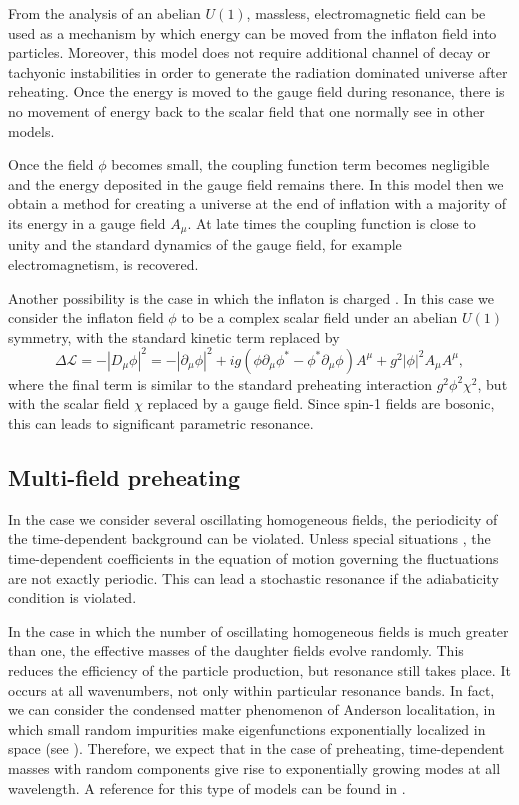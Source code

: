 \documentclass[11pt,a4paper,twoside]{book}
\begin{document}
From  the analysis of \cite{Chap4:GaugeFieldPreheating} an abelian $ U(1) $, massless, electromagnetic field can be used as a mechanism  by which energy can be moved from the inflaton field into particles. Moreover, this model does not require additional channel of decay or tachyonic instabilities in order to generate the radiation dominated universe after reheating. Once the energy is moved to the gauge field during resonance, there is no movement of energy back to the scalar field that one normally see in other models.

Once the field $\phi$ becomes small, the coupling function term becomes negligible and the energy deposited in the gauge field remains there. In this model then we obtain a method for creating a universe at the end of inflation with a majority of its energy in a gauge field $ A_{\mu} $. At late times the coupling function is close to unity and the standard dynamics of the gauge field, for example electromagnetism, is recovered. 

Another possibility is the case in which the inflaton is charged \cite{Chap4:ChargedInflatonPreheating}. In this case we consider  the inflaton field $\phi$ to be a complex scalar field under an abelian $ U(1) $ symmetry, with the standard kinetic term replaced by 
\begin{equation}
\label{Chap4:OtherModels_U1KineticTemr}
\Delta \mathcal{L} = - |D_{\mu}\phi|^{2} = -|\partial_{\mu}\phi|^{2} + ig(\phi \partial_{\mu}\phi^{*}-\phi^{*}\partial_{\mu}\phi)A^{\mu} + g^{2}|\phi|^{2}A_{\mu}A^{\mu},
\end{equation}
where the final term is similar to the standard preheating interaction $ g^{2}\phi^{2}\chi^{2} $, but with the scalar field $\chi$ replaced by a gauge field. Since spin-1 fields are bosonic, this can leads to significant parametric resonance. 

\subsection{Multi-field preheating}
In the case we consider several oscillating homogeneous fields, the periodicity of the time-dependent background can be violated. Unless special situations \cite{Chap4:Lozanov}, the time-dependent coefficients in the equation of motion governing the fluctuations are not exactly periodic. This can lead a stochastic resonance if the adiabaticity condition is violated. 

In the case in which the number of oscillating homogeneous fields is much greater than one, the effective masses of the daughter fields evolve randomly. This reduces the efficiency of the particle production, but resonance still takes place. It occurs at all wavenumbers, not only within particular resonance bands. In fact, we can consider the condensed matter phenomenon of Anderson localitation, in which small random impurities make eigenfunctions exponentially localized in space (see \cite{Chap4:Lozanov}). Therefore, we expect that in the case of preheating, time-dependent masses with random components give rise to exponentially growing modes at all wavelength. A reference for this type of models can  be found in \cite{Chap4:multifieldPreheating}.
\end{document}
